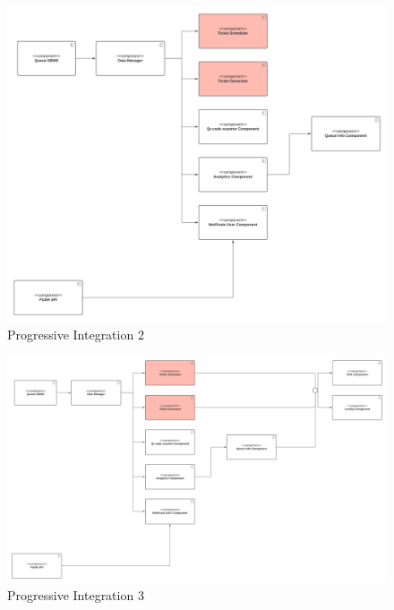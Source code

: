 \begin{itemize}
\begin{figure}[h!]
        \includegraphics[width=1\textwidth]{Images/Test Diagram/Queue/queueserviceprogressive/2.1.png}
        \caption{\label{fig:QueueInternal2.1}{Progressive Integration 2}}
    \end{figure} 
    \begin{figure}[h!]
        \centering
        \includegraphics[width=1\textwidth]{Images/Test Diagram/Queue/queueserviceprogressive/3.png}
        \caption{\label{fig:QueueInternal3}{Progressive Integration 3}}
    \end{figure} 


    
\end{itemize}


